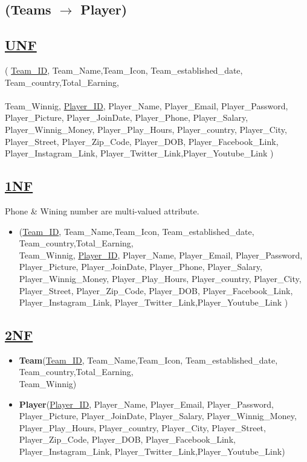 \subsection{\texorpdfstring{\centering (Teams $\rightarrow$ Player)}{ (Teams - Player)}}


\subsection*{\underline{UNF}}
(
\underline{Team\_ID}, Team\_Name,Team\_Icon, Team\_established\_date, Team\_country,Total\_Earning,\\\\Team\_Winnig,
\underline{Player\_ID}, Player\_Name, Player\_Email, Player\_Password, Player\_Picture, Player\_JoinDate, Player\_Phone, Player\_Salary, Player\_Winnig\_Money, Player\_Play\_Hours, Player\_country, Player\_City, Player\_Street, Player\_Zip\_Code, Player\_DOB,
Player\_Facebook\_Link, Player\_Instagram\_Link,
Player\_Twitter\_Link,Player\_Youtube\_Link
)

\subsection*{\underline{1NF}}
Phone \& Wining number are multi-valued attribute.
\vskip 0.2in

\begin{itemize}
    \item
          (\underline{Team\_ID}, Team\_Name,Team\_Icon, Team\_established\_date, Team\_country,Total\_Earning,\\Team\_Winnig,
          \underline{Player\_ID}, Player\_Name, Player\_Email, Player\_Password, Player\_Picture, Player\_JoinDate, Player\_Phone, Player\_Salary, Player\_Winnig\_Money, Player\_Play\_Hours, Player\_country, Player\_City, Player\_Street, Player\_Zip\_Code, Player\_DOB,
          Player\_Facebook\_Link, Player\_Instagram\_Link,
          Player\_Twitter\_Link,Player\_Youtube\_Link
          )
\end{itemize}

\subsection*{\underline{2NF}}
\begin{itemize}
    \item \textbf{Team}(\underline{Team\_ID}, Team\_Name,Team\_Icon, Team\_established\_date, Team\_country,Total\_Earning,\\Team\_Winnig)
    \item \textbf{Player}(\underline{Player\_ID}, Player\_Name, Player\_Email, Player\_Password, Player\_Picture, Player\_JoinDate, Player\_Salary, Player\_Winnig\_Money, Player\_Play\_Hours, Player\_country, Player\_City, Player\_Street, Player\_Zip\_Code, Player\_DOB, Player\_Facebook\_Link, Player\_Instagram\_Link, Player\_Twitter\_Link,Player\_Youtube\_Link)
\end{itemize}


